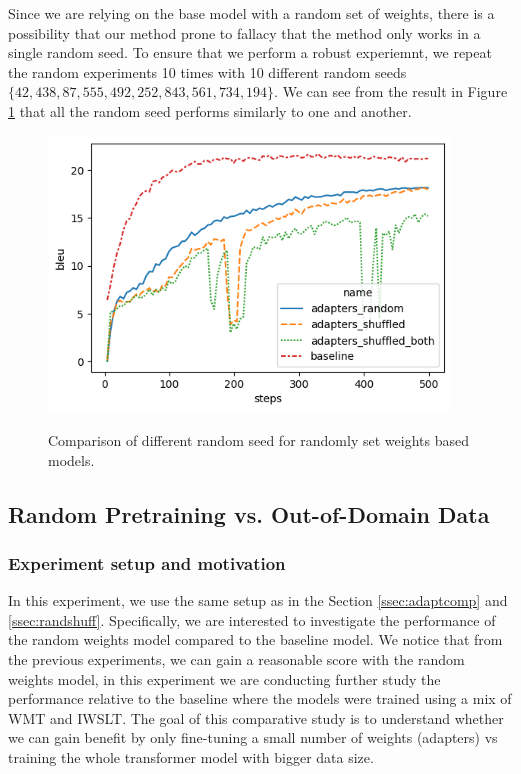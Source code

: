 Since we are relying on the base model with a random set of weights, there is a possibility that our method prone to fallacy that the method only works in a single random seed. To ensure that we perform a robust experiemnt, we repeat the random experiments 10 times with 10 different random seeds $\{42, 438, 87, 555, 492, 252, 843, 561, 734, 194\}$. We can see from the result in Figure \ref{img:rndmseed} that all the random seed performs similarly to one and another.

\begin{figure}[h]
    {\includegraphics[width=0.95\textwidth]{img/randomshuffled.png}}
    \centering
    \caption{Comparison of different random seed for randomly set weights based models.}
    \label{img:rndmseed}
\end{figure}

\subsection{Random Pretraining vs. Out-of-Domain Data}
\label{ssec:randpre}
\subsubsection{Experiment setup and motivation}
In this experiment, we use the same setup as in the Section \ref{ssec:adaptcomp} and \ref{ssec:randshuff}. Specifically, we are interested to investigate the performance of the random weights model compared to the baseline model. We notice that from the previous experiments, we can gain a reasonable score with the random weights model, in this experiment we are conducting further study the performance relative to the baseline where the models were trained using a mix of WMT and IWSLT. The goal of this comparative study is to understand whether we can gain benefit by only fine-tuning a small number of weights (adapters) vs training the whole transformer model with bigger data size.

